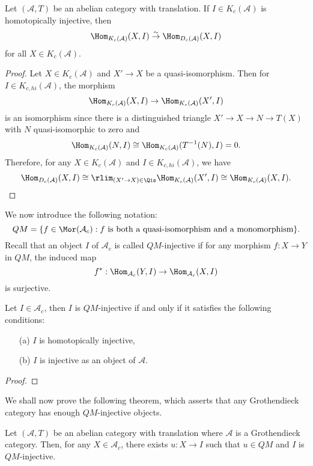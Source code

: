 \begin{lemma}\label{abelian translation K-injective Hom K is D}
Let $(\mathcal{A},T)$ be an abelian category with translation. If $I\in K_c(\mathcal{A})$ is homotopically injective, then
\[\Hom_{K_c(\mathcal{A})}(X,I)\stackrel{\sim}{\to} \Hom_{D_c(\mathcal{A})}(X,I)\]
for all $X\in K_c(\mathcal{A})$.
\end{lemma}
\begin{proof}
Let $X\in K_c(\mathcal{A})$ and $X'\to X$ be a quasi-isomorphism. Then for $I\in K_{c,hi}(\mathcal{A})$, the morphism
\[\Hom_{K_c(\mathcal{A})}(X,I)\to\Hom_{K_c(\mathcal{A})}(X',I)\]
is an isomorphism since there is a distinguished triangle $X'\to X\to N\to T(X)$ with $N$ quasi-isomorphic to zero and
\[\Hom_{K_c(\mathcal{A})}(N,I)\cong \Hom_{K_c(\mathcal{A})}(T^{-1}(N),I)=0.\]
Therefore, for any $X\in K_c(\mathcal{A})$ and $I\in K_{c,hi}(\mathcal{A})$, we have
\begin{equation*}
\Hom_{D_c(\mathcal{A})}(X,I)\cong\rlim_{(X'\to X)\in\Qis}\Hom_{K_c(\mathcal{A})}(X',I)\cong\Hom_{K_c(\mathcal{A})}(X,I).\qedhere
\end{equation*}
\end{proof}

We now introduce the following notation:
\[QM=\{f\in\Mor(\mathcal{A}_c):\text{$f$ is both a quasi-isomorphism and a monomorphism}\}.\]
Recall that an object $I$ of $\mathcal{A}_c$ is called $QM$-injective if for any morphism $f:X\to Y$ in $QM$, the induced map
\[f^*:\Hom_{\mathcal{A}_c}(Y,I)\to\Hom_{\mathcal{A}_c}(X,I)\]
is surjective.

\begin{proposition}\label{abelian translation QM-injective iff}
Let $I\in\mathcal{A}_c$, then $I$ is $QM$-injective if and only if it satisfies the following conditions:
\begin{enumerate}
    \item[(a)] $I$ is homotopically injective,
    \item[(b)] $I$ is injective as an object of $\mathcal{A}$.
\end{enumerate}
\end{proposition}
\begin{proof}

\end{proof}

We shall now prove the following theorem, which asserts that any Grothendieck category has enough $QM$-injective objects.
\begin{theorem}\label{abelian translation Grothendieck enough QM-injective}
Let $(\mathcal{A},T)$ be an abelian category with translation where $\mathcal{A}$ is a Grothendieck category. Then, for any $X\in\mathcal{A}_c$, there exists $u:X\to I$ such that $u\in QM$ and $I$ is $QM$-injective.
\end{theorem}

